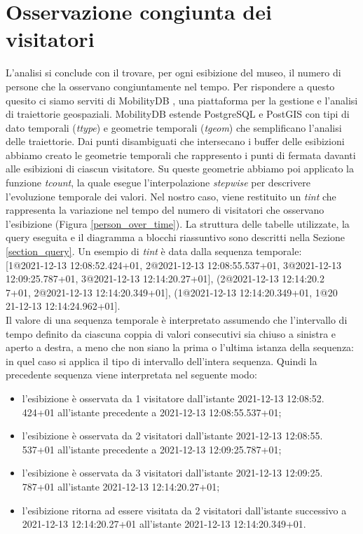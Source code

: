 \documentclass[12pt]{article}
\begin{document}
\section{Osservazione congiunta dei visitatori}
L'analisi si conclude con il trovare, per ogni esibizione del museo, il numero di persone che la osservano congiuntamente nel tempo.
Per rispondere a questo quesito ci siamo serviti di MobilityDB \cite{MobilityDBTODS2020}, una piattaforma per la gestione e l'analisi di traiettorie geospaziali.
MobilityDB estende PostgreSQL e PostGIS con tipi di dato temporali (\emph{ttype}) e geometrie temporali (\emph{tgeom}) che semplificano l'analisi delle traiettorie.
Dai punti disambiguati che intersecano i buffer delle esibizioni abbiamo creato le geometrie temporali che rappresento i punti di fermata davanti alle esibizioni di ciascun visitatore.
Su queste geometrie abbiamo poi applicato la funzione \emph{tcount}, la quale esegue l'interpolazione \emph{stepwise} per descrivere l'evoluzione temporale dei valori.
Nel nostro caso, viene restituito un \emph{tint} che rappresenta la variazione nel tempo del numero di visitatori che osservano l'esibizione (Figura \ref{person_over_time}).
La struttura delle tabelle utilizzate, la query eseguita e il diagramma a blocchi riassuntivo sono descritti nella Sezione \ref{section_query}.
Un esempio di \emph{tint} è data dalla sequenza temporale: \\
{[1@2021-12-13 12:08:52.424+01, 2@2021-12-13 12:08:55.537+01, 3@2021-12-13 12:09:25.787+01, 3@2021-12-13 12:14:20.27+01], (2@2021-12-13 12:14:20.2\\7+01, 2@2021-12-13 12:14:20.349+01], (1@2021-12-13 12:14:20.349+01, 1@20\\21-12-13 12:14:24.962+01]}.\\
Il valore di una sequenza temporale è interpretato assumendo che l'intervallo di tempo definito da ciascuna coppia di valori consecutivi sia chiuso a sinistra e aperto a destra, a meno che non siano la prima o l'ultima istanza della sequenza: in quel caso si applica il tipo di intervallo dell'intera sequenza.
Quindi la precedente sequenza viene interpretata nel seguente modo:
\begin{itemize}
    \item l'esibizione è osservata da 1 visitatore dall'istante 2021-12-13 12:08:52.\\424+01 all'istante precedente a 2021-12-13 12:08:55.537+01;
    \item l'esibizione è osservata da 2 visitatori dall'istante 2021-12-13 12:08:55.\\537+01 all'istante precedente a 2021-12-13 12:09:25.787+01;
    \item l'esibizione è osservata da 3 visitatori dall'istante 2021-12-13 12:09:25.\\787+01 all'istante 2021-12-13 12:14:20.27+01;
    \item l'esibizione ritorna ad essere visitata da 2 visitatori dall'istante successivo a 2021-12-13 12:14:20.27+01 all'istante 2021-12-13 12:14:20.349+01.
\end{itemize}
\end{document}
